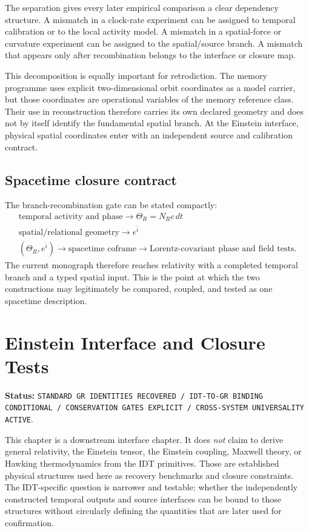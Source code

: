\documentclass[11pt]{book}
\begin{document}
The separation gives every later empirical comparison a clear dependency structure. A mismatch in a clock-rate experiment can be assigned to temporal calibration or to the local activity model. A mismatch in a spatial-force or curvature experiment can be assigned to the spatial/source branch. A mismatch that appears only after recombination belongs to the interface or closure map.

This decomposition is equally important for retrodiction. The memory programme uses explicit two-dimensional orbit coordinates as a model carrier, but those coordinates are operational variables of the memory reference class. Their use in reconstruction therefore carries its own declared geometry and does not by itself identify the fundamental spatial branch. At the Einstein interface, physical spatial coordinates enter with an independent source and calibration contract.

\section{Spacetime closure contract}

The branch-recombination gate can be stated compactly:
\[
\boxed{
\begin{array}{c}
\text{temporal activity and phase}
\longrightarrow
\Theta_R=N_Rc\,dt\\[2mm]
\text{spatial/relational geometry}
\longrightarrow
e^{\hat i}\\[2mm]
(\Theta_R,e^{\hat i})
\longrightarrow
\text{spacetime coframe}
\longrightarrow
\text{Lorentz-covariant phase and field tests}.
\end{array}}
\]
The current monograph therefore reaches relativity with a completed temporal branch and a typed spatial input. This is the point at which the two constructions may legitimately be compared, coupled, and tested as one spacetime description.

\chapter{Einstein Interface and Closure Tests}

\noindent\textbf{Status:} \texttt{STANDARD GR IDENTITIES RECOVERED / IDT-TO-GR BINDING CONDITIONAL / CONSERVATION GATES EXPLICIT / CROSS-SYSTEM UNIVERSALITY ACTIVE}.

This chapter is a downstream interface chapter. It does \emph{not} claim to derive general relativity, the Einstein tensor, the Einstein coupling, Maxwell theory, or Hawking thermodynamics from the IDT primitives. Those are established physical structures used here as recovery benchmarks and closure constraints. The IDT-specific question is narrower and testable: whether the independently constructed temporal outputs and source interfaces can be bound to those structures without circularly defining the quantities that are later used for confirmation.
\end{document}
